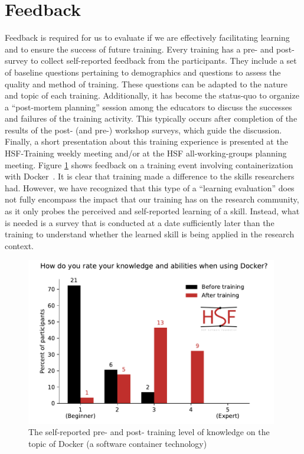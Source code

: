 \documentclass[twocolumn]{svjour3}          %
\begin{document}
\section{Feedback}\label{sec:Feedback}
%
Feedback is required for us to evaluate if we are effectively facilitating learning and to ensure the success of future training. Every training has a pre- and post- survey to collect self-reported feedback from the participants. They include a set of baseline questions pertaining to demographics and questions to assess the quality and method of training. These questions can be adapted to the nature and topic of each training. Additionally, it has become the status-quo to organize a ``post-mortem planning'' session among the educators to discuss the successes and failures of the training activity. This typically occurs after completion of the results of the post- (and pre-) workshop surveys, which guide the discussion. Finally, a short presentation about this training experience is presented at the HSF-Training weekly meeting and/or at the HSF all-working-groups planning meeting. Figure \ref{fig:dockerfeedback} shows feedback on a training event involving containerization with Docker~\cite{HSF-training-Docker-2020}.  It is clear that training made a difference to the skills researchers had.  However, we have recognized that this type of a ``learning evaluation'' does not fully encompass the impact that our training has on the research community, as it only probes the perceived and self-reported learning of a skill.  Instead, what is needed is a survey that is conducted at a date sufficiently later than the training to understand whether the learned skill is being applied in the research context. 
%
\begin{figure}
\centering
\includegraphics[width=11cm]{dockerfeedback_new.pdf}
\caption{The self-reported  pre- and post- training level of knowledge on the topic of Docker (a software container technology)
\label{fig:dockerfeedback}}
\end{figure}
%
\end{document}
